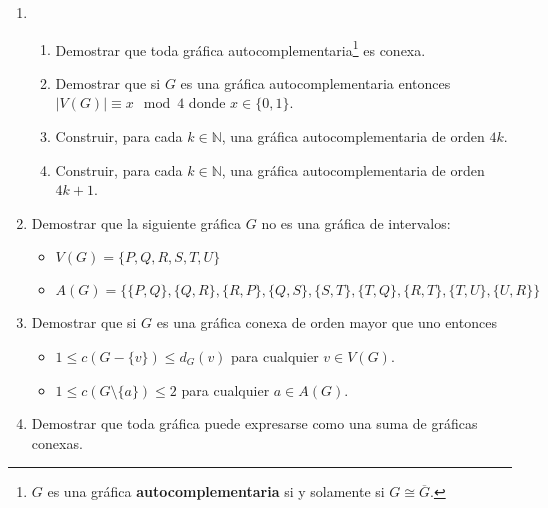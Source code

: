 \documentclass[12pt]{report}
\numberwithin{section}{chapter}
\begin{document}
\begin{enumerate}
\item 
\begin{enumerate}
\item Demostrar que toda gráfica autocomplementaria\footnote{$G$ es una gráfica \textbf{autocomplementaria} si y solamente si $G \cong \overline G$.} es conexa.

\item Demostrar que si $G$ es una gráfica autocomplementaria entonces $|V(G)| \equiv x \mod 4$ donde $x \in \{0,1\}$.

\item Construir, para cada $k \in \mathbb N$, una gráfica autocomplementaria de orden $4k$.

\item Construir, para cada $k \in \mathbb N$, una gráfica autocomplementaria de orden $4k+1$.

\end{enumerate}

\item Demostrar que la siguiente gráfica $G$ no es una gráfica de intervalos:
\begin{itemize}
\item $V(G)=\{P,Q,R,S,T,U\}$
\item $A(G) = \{\{P,Q\},\{Q,R\},\{R,P\},\{Q,S\},\{S,T\},\{T,Q\},\{R,T\},\{T,U\},\{U,R\}\}$
\end{itemize}

\item Demostrar que si $G$ es una gráfica conexa de orden mayor que uno entonces
\begin{itemize}
\item $1 \leq c(G-\{v\}) \leq d_G(v)$ para cualquier $v \in V(G)$.
\item $1 \leq c(G\setminus \{a\}) \leq 2$ para cualquier $a \in A(G)$.
\end{itemize}


\item Demostrar que toda gráfica puede expresarse como una suma de gráficas conexas.




\end{enumerate}
\end{document}
